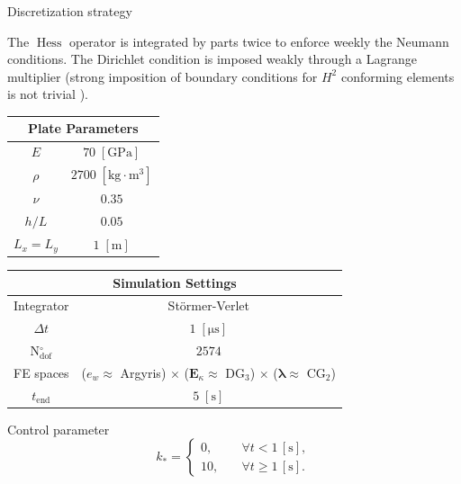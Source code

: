 \documentclass[aspectratio=169]{ISAE-Beamer}
\DeclareMathOperator*{\Hess}{Hess}
\begin{document}
\begin{frame}{Discretization strategy}

The $\Hess$ operator is integrated by parts twice to enforce weekly the Neumann conditions. The Dirichlet condition is imposed weakly through a Lagrange multiplier (strong imposition of boundary conditions for $H^2$ conforming elements is not trivial ). 

\begin{table}[t]
	\centering
	\begin{tabular}{|c|c|}
		\hline 
		\multicolumn{2}{|c|}{Plate Parameters} \\ 
		\hline 
		$E$ & $70\; \mathrm{[GPa]}$ \\ 
		$\rho$ & $2700\; \mathrm{[kg \cdot m^3]}$ \\ 
		$\nu$& $0.35$ \\ 
		$h/L$& $0.05$ \\ 
		$L_x = L_y$& $1\; \mathrm{[m]}$\\ 
		\hline 
	\end{tabular} \hspace{.1cm}
	\begin{tabular}{|c|c|}
		\hline 
		\multicolumn{2}{|c|}{Simulation Settings} \\
		\hline 
		Integrator & St\"ormer-Verlet \\
		$\Delta t $ & $1 \; \mathrm{[\mu s]}$ \\  
		N$_{\text{dof}}^\circ$ & $2574$ \\
		FE spaces & ($e_w \approx $ Argyris) $\times$ ($\bm{E}_\kappa \approx$ DG$_3$) $\times$ ($\bm{\lambda} \approx$ CG$_2$)\\
		$t_{\text{end}}$ & $5\; \mathrm{[s]}$\\ 
		\hline 
	\end{tabular} 
\end{table}
	\vspace{.5cm}
	Control parameter 
	\begin{equation*}
	k_* = 
	\begin{cases}
	0, \quad &\forall t < 1 \, [\mathrm{s}], \\
	10, \quad &\forall t \ge 1 \, [\mathrm{s}].
	\end{cases}
	\end{equation*}

	
\end{frame}
\end{document}
